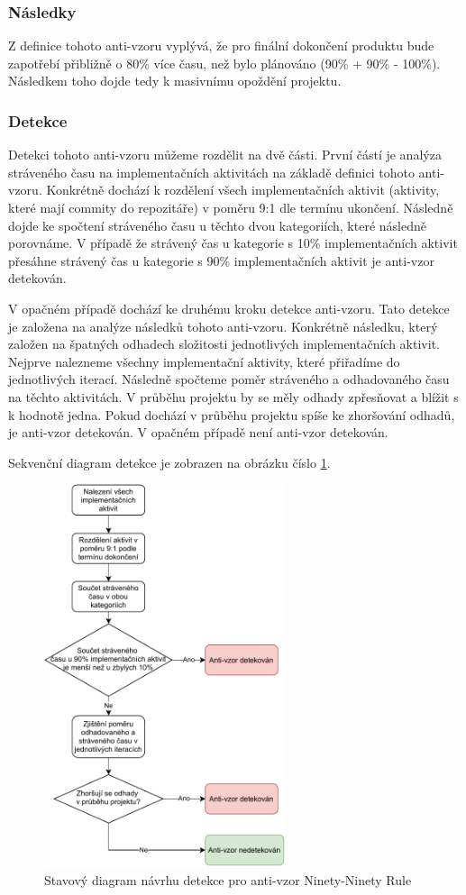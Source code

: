 \documentclass[czech,DP]{thesiskiv}
\begin{document}
\subsubsection{Následky}
Z definice tohoto anti-vzoru vyplývá, že pro finální dokončení produktu bude zapotřebí přibližně o 80\% více času, než bylo plánováno (90\% + 90\% - 100\%). Následkem toho dojde tedy k masivnímu opoždění projektu.
\subsubsection{Detekce}
Detekci tohoto anti-vzoru můžeme rozdělit na dvě části. První částí je analýza stráveného času na implementačních aktivitách na základě definici tohoto anti-vzoru. Konkrétně dochází k rozdělení všech implementačních aktivit (aktivity, které mají commity do repozitáře) v poměru 9:1 dle termínu ukončení. Následně dojde ke spočtení stráveného času u těchto dvou kategoriích, které následně porovnáme. V případě že strávený čas u kategorie s 10\% implementačních aktivit přesáhne strávený čas u kategorie s 90\% implementačních aktivit je anti-vzor detekován.
\par
V opačném případě dochází ke druhému kroku detekce anti-vzoru. Tato detekce je založena na analýze následků tohoto anti-vzoru. Konkrétně následku, který založen na špatných odhadech složitosti jednotlivých implementačních aktivit. Nejprve nalezneme všechny implementační aktivity, které přiřadíme do jednotlivých iterací. Následně spočteme poměr stráveného a odhadovaného času na těchto aktivitách. V průběhu projektu by se měly odhady zpřesňovat a blížit s k hodnotě jedna. Pokud dochází v průběhu projektu spíše ke zhoršování odhadů, je anti-vzor detekován. V opačném případě není anti-vzor detekován.
\par
Sekvenční diagram detekce je zobrazen na obrázku číslo \ref{img:ninety_ninety_rule}.
\begin{figure}[!htb]
    \centering
    \includegraphics[width=200pt]{img/ninety_ninety_rule.pdf}
    \caption{Stavový diagram návrhu detekce pro anti-vzor Ninety-Ninety Rule}
    \label{img:ninety_ninety_rule}
\end{figure}
\FloatBarrier
\end{document}
